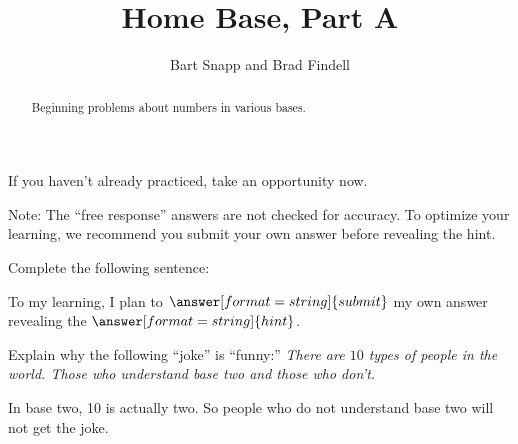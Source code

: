 \documentclass[nooutcomes]{ximera}
\title{Home Base, Part A}
\author{Bart Snapp and Brad Findell}
\begin{document}
\begin{abstract}
Beginning problems about numbers in various bases. 
\end{abstract}
\maketitle

%
%

If you haven't already practiced, take an opportunity now.  

\begin{center}
\end{center}

\begin{center}
\end{center}



\begin{problem}
Note:  The ``free response'' answers are not checked for accuracy.  To optimize your learning, we recommend you submit your own answer before revealing the hint.  

Complete the following sentence: 

To  my learning, I plan to $\answer[format=string]{submit}$ my own answer  revealing the $\answer[format=string]{hint}$.  
\end{problem}

\begin{problem}Explain why the following ``joke'' is ``funny:'' \textit{There
  are $10$ types of people in the world. Those who understand base two
  and those who don't.}
\begin{freeResponse}
\begin{hint}
In base two, 10 is actually two.  So people who do not understand base two will not get the joke.  
\end{hint}
\end{freeResponse}
\end{problem} 
\end{document}
